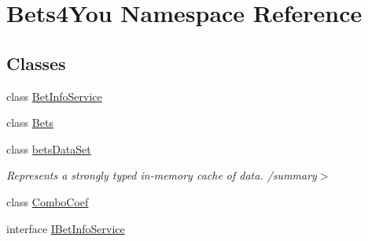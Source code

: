 \hypertarget{namespace_bets4_you}{}\section{Bets4\+You Namespace Reference}
\label{namespace_bets4_you}
\subsection*{Classes}
\begin{DoxyCompactItemize}
\item 
class \mbox{\hyperlink{class_bets4_you_1_1_bet_info_service}{Bet\+Info\+Service}}
\item 
class \mbox{\hyperlink{class_bets4_you_1_1_bets}{Bets}}
\item 
class \mbox{\hyperlink{class_bets4_you_1_1bets_data_set}{bets\+Data\+Set}}
\begin{DoxyCompactList}\small\item\em Represents a strongly typed in-\/memory cache of data. /summary$>$ \end{DoxyCompactList}\item 
class \mbox{\hyperlink{class_bets4_you_1_1_combo_coef}{Combo\+Coef}}
\item 
interface \mbox{\hyperlink{interface_bets4_you_1_1_i_bet_info_service}{I\+Bet\+Info\+Service}}
\end{DoxyCompactItemize}
